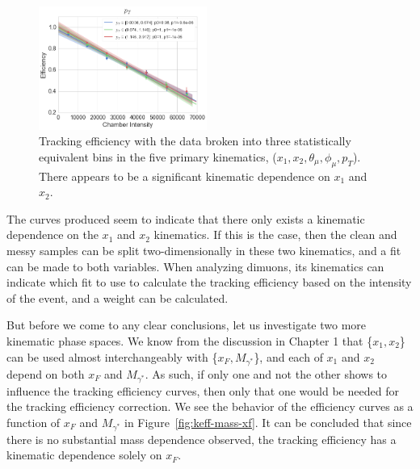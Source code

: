 \begin{figure}
\includegraphics[width=0.49\textwidth]{figures/analysis/pt-keff-int.png} \vspace{10px}
\caption{Tracking efficiency with the data broken into three statistically equivalent bins in the five primary kinematics, ($x_1, x_2, \theta_\mu, \phi_\mu, p_T$). There appears to be a significant kinematic dependence on $x_1$ and $x_2$.}
\label{fig:keff-all-kin}
\end{figure}
The curves produced seem to indicate that there only exists a kinematic dependence on the $x_1$ and $x_2$ kinematics. If this is the case, then the clean and messy samples can be split two-dimensionally in these two kinematics, and a fit can be made to both variables. When analyzing dimuons, its kinematics can indicate which fit to use to calculate the tracking efficiency based on the intensity of the event, and a weight can be calculated.

But before we come to any clear conclusions, let us investigate two more kinematic phase spaces. We know from the discussion in Chapter 1 that \{$x_1, x_2$\} can be used almost interchangeably with \{$x_F, M_{\gamma^*}$\}, and each of $x_1$ and $x_2$ depend on both $x_F$ and $M_{\gamma^*}$. As such, if only one and not the other shows to influence the tracking efficiency curves, then only that one would be needed for the tracking efficiency correction. We see the behavior of the efficiency curves as a function of $x_F$ and $M_{\gamma^*}$ in Figure~\ref{fig:keff-mass-xf}. It can be concluded that since there is no substantial mass dependence observed, the tracking efficiency has a kinematic dependence solely on $x_F$.

